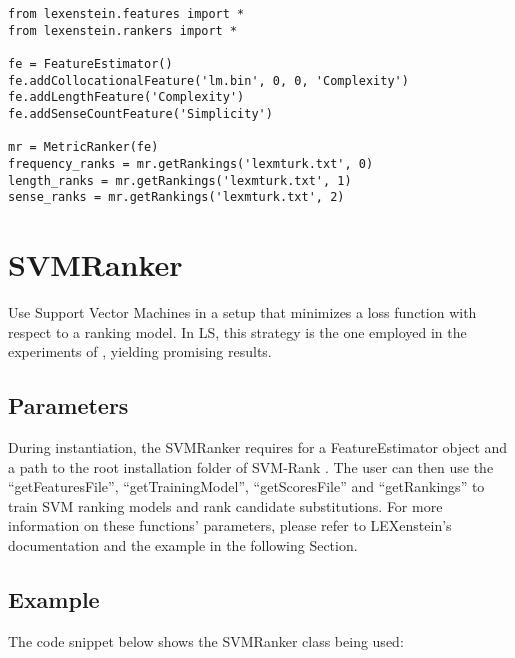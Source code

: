 \begin{lstlisting}
from lexenstein.features import *
from lexenstein.rankers import *

fe = FeatureEstimator()
fe.addCollocationalFeature('lm.bin', 0, 0, 'Complexity')
fe.addLengthFeature('Complexity')
fe.addSenseCountFeature('Simplicity')

mr = MetricRanker(fe)
frequency_ranks = mr.getRankings('lexmturk.txt', 0)
length_ranks = mr.getRankings('lexmturk.txt', 1)
sense_ranks = mr.getRankings('lexmturk.txt', 2)
\end{lstlisting}










\section{SVMRanker}

Use Support Vector Machines in a setup that minimizes a loss function with respect to a ranking model. In LS, this strategy is the one employed in the experiments of \cite{Horn2014}, yielding promising results.

\subsection{Parameters}

During instantiation, the SVMRanker requires for a FeatureEstimator object and a path to the root installation folder of SVM-Rank \cite{svmrank}. The user can then use the ``getFeaturesFile'', ``getTrainingModel'', ``getScoresFile'' and ``getRankings'' to train SVM ranking models and rank candidate substitutions. For more information on these functions' parameters, please refer to LEXenstein's documentation and the example in the following Section.

\subsection{Example}

The code snippet below shows the SVMRanker class being used:

